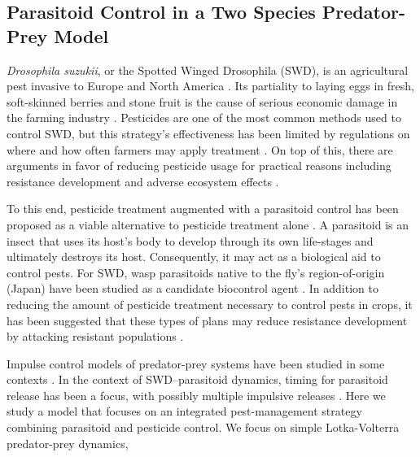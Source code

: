 \documentclass{article}
\theoremstyle{definition}
\begin{document}
\subsection{Parasitoid Control in a Two Species Predator-Prey Model}
{\it Drosophila suzukii}, or the Spotted Winged Drosophila (SWD), is an agricultural pest invasive to Europe and North America \cite{wang_swd_review_2026}. Its partiality to laying eggs in fresh, soft-skinned berries and stone fruit is the cause of serious economic damage in the farming industry \cite{wang_swd_review_2026}. Pesticides are one of the most common methods used to control SWD, but this strategy's effectiveness has been limited by regulations on where and how often farmers may apply treatment \cite{lee_swd_pesticide_2015, haviland_mrl_swd_2012,goodhue_swd_crop_rejection_2011}. On top of this, there are arguments in favor of reducing pesticide usage for practical reasons including resistance development and adverse ecosystem effects \cite{gress_swd_resistance_2019}.

To this end, pesticide treatment augmented with a parasitoid control has been proposed as a viable alternative to pesticide treatment alone \cite{wang_parasitoid_2020,wang_swd_review_2026}. A parasitoid is an insect that uses its host's body to develop through its own life-stages and ultimately destroys its host. Consequently, it may act as a biological aid to control pests. For SWD, wasp parasitoids native to the fly's region-of-origin (Japan) have been studied as a candidate biocontrol agent \cite{wang_swd_review_2026}. In addition to reducing the amount of pesticide treatment necessary to control pests in crops, it has been suggested that these types of plans may reduce resistance development by attacking resistant populations \cite{lee2019biological,liu2014natural, rossistacconi2019augmentative}.

Impulse control models of predator-prey systems have been studied in some contexts \cite{heimpel_biocontrol_overview_2018, xie_predator_prey_example_2017,wang_predator_prey_example_2008}. In the context of SWD--parasitoid dynamics, timing for parasitoid release has been a focus, with possibly multiple impulsive releases \cite{pfab_optimized_2018, mailleret_pulsed_biocontrol_2009}. Here we study a model that focuses on an integrated pest-management strategy combining parasitoid and pesticide control. We focus on simple Lotka-Volterra predator-prey dynamics, 
\end{document}
